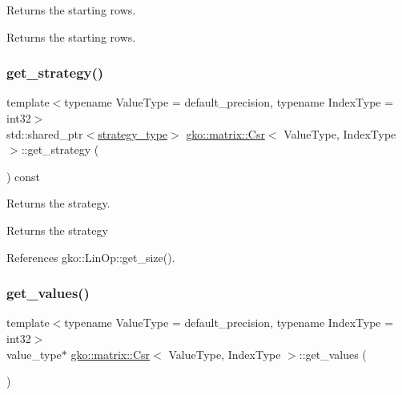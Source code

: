 Returns the starting rows. 

\begin{DoxyReturn}{Returns}
the starting rows. 
\end{DoxyReturn}
\mbox{\label{classgko_1_1matrix_1_1Csr_ada0db14e65dfe027f483dc449f704a7e}} 
\subsubsection{\texorpdfstring{get\+\_\+strategy()}{get\_strategy()}}
{\footnotesize\ttfamily template$<$typename Value\+Type = default\+\_\+precision, typename Index\+Type = int32$>$ \\
std\+::shared\+\_\+ptr$<$\hyperlink{classgko_1_1matrix_1_1Csr_1_1strategy__type}{strategy\+\_\+type}$>$ \hyperlink{classgko_1_1matrix_1_1Csr}{gko\+::matrix\+::\+Csr}$<$ Value\+Type, Index\+Type $>$\+::get\+\_\+strategy (\begin{DoxyParamCaption}{ }\end{DoxyParamCaption}) const\hspace{0.3cm}{\ttfamily [noexcept]}}



Returns the strategy. 

\begin{DoxyReturn}{Returns}
the strategy 
\end{DoxyReturn}


References gko\+::\+Lin\+Op\+::get\+\_\+size().

\mbox{\label{classgko_1_1matrix_1_1Csr_a929b0a194e6aeb1252b8e6781d162e83}} 
\subsubsection{\texorpdfstring{get\+\_\+values()}{get\_values()}}
{\footnotesize\ttfamily template$<$typename Value\+Type = default\+\_\+precision, typename Index\+Type = int32$>$ \\
value\+\_\+type$\ast$ \hyperlink{classgko_1_1matrix_1_1Csr}{gko\+::matrix\+::\+Csr}$<$ Value\+Type, Index\+Type $>$\+::get\+\_\+values (\begin{DoxyParamCaption}{ }\end{DoxyParamCaption})\hspace{0.3cm}{\ttfamily [noexcept]}}



